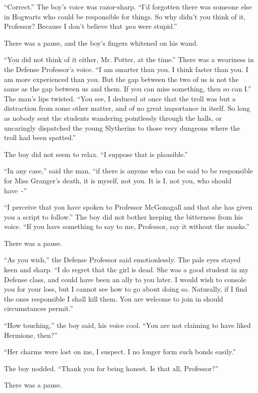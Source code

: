 ``Correct.'' The boy's voice was razor-sharp. ``I'd forgotten there was someone else in Hogwarts who could be responsible for things. So why didn't you think of it, Professor? Because I don't believe that \emph{you} were stupid.''

There was a pause, and the boy's fingers whitened on his wand.

``You did not think of it either, Mr. Potter, at the time.'' There was a weariness in the Defense Professor's voice. ``I am smarter than you. I think faster than you. I am more experienced than you. But the gap between the two of us is not the same as the gap between us and them. If you can miss something, then so can I.'' The man's lips twisted. ``You see, I deduced at once that the troll was but a distraction from some other matter, and of no great importance in itself. So long as nobody sent the students wandering pointlessly through the halls, or uncaringly dispatched the young Slytherins to those very dungeons where the troll had been spotted.''

The boy did not seem to relax. ``I suppose that is plausible.''

``In any case,'' said the man, ``if there is anyone who can be said to be responsible for Miss Granger's death, it is myself, not you. It is I, not you, who should have~-''

``I perceive that you have spoken to Professor McGonagall and that she has given you a script to follow.'' The boy did not bother keeping the bitterness from his voice. ``If you have something to say to me, Professor, say it without the masks.''

There was a pause.

``As you wish,'' the Defense Professor said emotionlessly. The pale eyes stayed keen and sharp. ``I do regret that the girl is dead. She was a good student in my Defense class, and could have been an ally to you later. I would wish to console you for your loss, but I cannot see how to go about doing so. Naturally, if I find the ones responsible I shall kill them. You are welcome to join in should circumstances permit.''

``How touching,'' the boy said, his voice cool. ``You are not claiming to have liked Hermione, then?''

``Her charms were lost on me, I suspect. I no longer form such bonds easily.''

The boy nodded. ``Thank you for being honest. Is that all, Professor?''

There was a pause.

